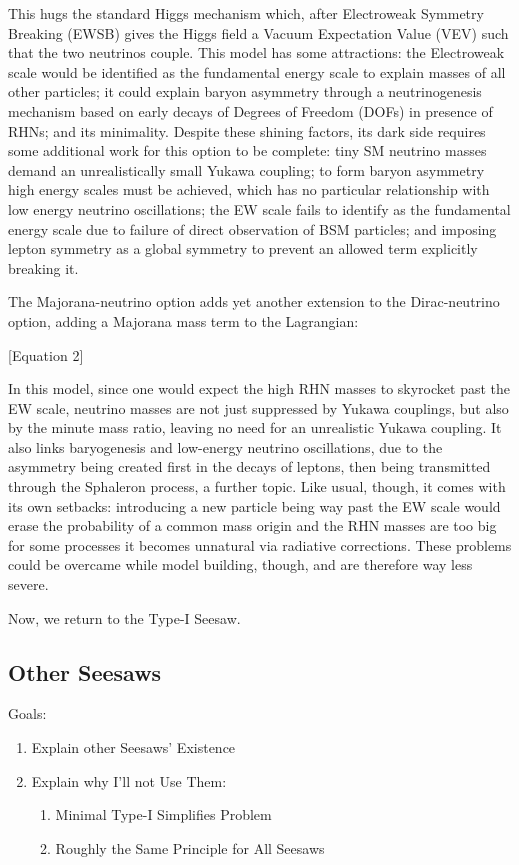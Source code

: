 \documentclass[a4paper,12pt]{article}
\begin{document}
This hugs the standard Higgs mechanism which, after Electroweak Symmetry Breaking (EWSB) gives the Higgs field a Vacuum Expectation Value (VEV) such that the two neutrinos couple. This model has some attractions: the Electroweak scale would be identified as the fundamental energy scale to explain masses of all other particles; it could explain baryon asymmetry through a neutrinogenesis mechanism based on early decays of Degrees of Freedom (DOFs) in presence of RHNs; and its minimality. Despite these shining factors, its dark side requires some additional work for this option to be complete: tiny SM neutrino masses demand an unrealistically small Yukawa coupling; to form baryon asymmetry high energy scales must be achieved, which has no particular relationship with low energy neutrino oscillations; the EW scale fails to identify as the fundamental energy scale due to failure of direct observation of BSM particles; and imposing lepton symmetry as a global symmetry to prevent an allowed term explicitly breaking it.

The Majorana-neutrino option adds yet another extension to the Dirac-neutrino option, adding a Majorana mass term to the Lagrangian:

[Equation 2]

In this model, since one would expect the high RHN masses to skyrocket past the EW scale, neutrino masses are not just suppressed by Yukawa couplings, but also by the minute mass ratio, leaving no need for an unrealistic Yukawa coupling. It also links baryogenesis and low-energy neutrino oscillations, due to the asymmetry being created first in the decays of leptons, then being transmitted through the Sphaleron process, a further topic. Like usual, though, it comes with its own setbacks: introducing a new particle being way past the EW scale would erase the probability of a common mass origin and the RHN masses are too big for some processes it becomes unnatural via radiative corrections. These problems could be overcame while model building, though, and are therefore way less severe.

 Now, we return to the Type-I Seesaw.

\subsection{Other Seesaws}

Goals:
\begin{enumerate}
	\item Explain other Seesaws’ Existence
	\item Explain why I’ll not Use Them:
	\begin{enumerate}
		\item Minimal Type-I Simplifies Problem
		\item Roughly the Same Principle for All Seesaws
	\end{enumerate}
\end{enumerate}
\end{document}
